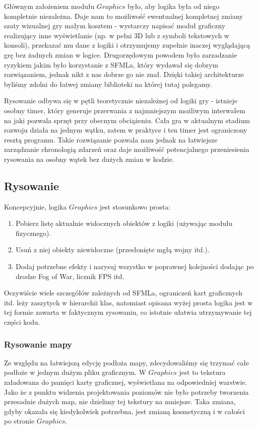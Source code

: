 \documentclass[licencjacka]{pracamgr}
\begin{document}
      Głównym założeniem modułu $Graphics$ było, aby logika była od niego kompletnie niezależna. Daje nam to możliwość
      ewentualnej kompletnej zmiany szaty wizualnej gry małym kosztem - wystarczy napisać moduł graficzny realizujący
      inne wyświetlanie (np. w pełni 3D lub z symboli tekstowych w konsoli), przekazać mu dane z logiki i otrzymujemy
      zupełnie inaczej wyglądającą grę bez żadnych zmian w logice. Drugorzędowym powodem było zarzadzanie ryzykiem jakim
      było korzystanie z SFMLa, który wydawał się dobrym rozwiązaniem, jednak nikt z nas dobrze go nie znał. Dzięki
      takiej architekturze byliśmy zdolni do łatwej zmiany biblioteki na której tutaj polegamy.

      Rysowanie odbywa się w pętli teoretycznie niezależnej od logiki gry - istnieje osobny timer, który generuje
      przerwania z najmniejszym możliwym interwałem na jaki pozwala sprzęt przy obecnym obciążeniu. Cała gra w aktualnym
      stadium rozwoju działa na jednym wątku, zatem w praktyce i ten timer jest ograniczony resztą programu. Takie
      rozwiązanie pozwala nam jednak na łatwiejsze zarządzanie chronologią zdarzeń oraz daje możliwość potencjalnego
      przeniesienia rysowania na osobny wątek bez dużych zmian w kodzie.

    \subsection{Rysowanie}
      Koncepcyjnie, logika $Graphics$ jest stosunkowo prosta:
      \begin{enumerate}
       \item Pobierz listę aktualnie widocznych obiektów z logiki (używając modułu fizycznego).
       \item Usuń z niej obiekty niewidoczne (przesłonięte mgłą wojny itd.).
       \item Dodaj potrzebne efekty i narysuj wszystko w poprawnej kolejności dodając po drodze Fog of War, licznik FPS
	  itd.
      \end{enumerate}
      Oczywiście wiele szczegółów zależnych od SFMLa, ograniczeń kart graficznych itd. leży zaszytych w hierarchii klas,
      natomiast opisana wyżej prosta logika jest w tej formie zawarta w faktycznym rysowaniu, co istotnie ułatwia
      utrzymywanie tej części kodu.

    \subsubsection{Rysowanie mapy}
      Ze względu na łatwiejszą edycję podłoża mapy, zdecydowaliśmy się trzymać całe podłoże w jednym dużym pliku
      graficznym. W $Graphics$ jest to tekstura załadowana do pamięci karty graficznej, wyświetlana na odpowiedniej
      warstwie. Jako że z punktu widzenia projektowania poziomów nie było potrzeby tworzenia przesadnie dużych map,
      nie dzielimy tej tekstury na mniejsze. Taka zmiana, gdyby okazała się kiedykolwiek potrzebna, jest zmianą
      kosmetyczną i w całości po stronie $Graphics$.
\end{document}

